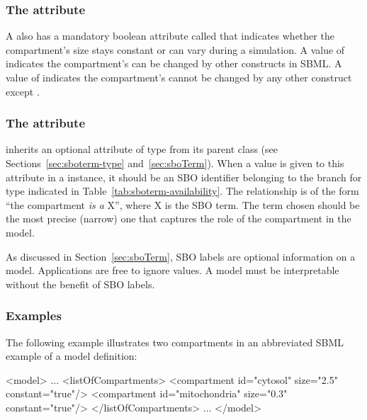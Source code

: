 \subsubsection{The  attribute}
\label{sec:compartment-constant}

A \Compartment also has a mandatory boolean attribute called
 that indicates whether the compartment's size
stays constant or can vary during a simulation.  A value of
 indicates the compartment's  can be
changed by other constructs in SBML.  A value of 
indicates the compartment's  cannot be changed by any
other construct except \InitialAssignment. 


\subsubsection{The  attribute}
\label{sec:compartment-sboterm}

\Compartment inherits an optional 
attribute of type  from its parent
class \SBase (see Sections~\ref{sec:sboterm-type}
and~\ref{sec:sboTerm}).  When a value is given to this
attribute in a \Compartment instance, it should be an
SBO identifier belonging to the branch for type \Compartment 
indicated in Table~\ref{tab:sboterm-availability}.  The relationship is
of the form ``the compartment  \emph{is a} X'', where X is
the SBO term.  The term chosen should be the most precise (narrow)
one that captures the role of the compartment in the model.

As discussed in Section~\ref{sec:sboTerm}, SBO labels are optional
information on a model.  Applications are free to ignore
 values.  A model must be interpretable without the
benefit of SBO labels.


\subsubsection{Examples}

The following example illustrates two compartments in an
abbreviated SBML example of a model definition:

\begin{example}
<model>
    ...
    <listOfCompartments>
        <compartment id="cytosol" size="2.5" constant="true"/>
        <compartment id="mitochondria" size="0.3" constant="true"/>
    </listOfCompartments>
    ...
</model>

\end{example}


